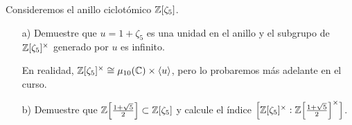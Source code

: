 \begin{ejercicio}
  Consideremos el anillo ciclotómico $\mathbb{Z} [\zeta_5]$.

  \begin{enumerate}
  \item[a)] Demuestre que $u = 1 + \zeta_5$ es una unidad en el anillo 
    y el subgrupo de $\mathbb{Z} [\zeta_5]^\times$ generado por $u$ es infinito.

    En realidad,
    $\mathbb{Z} [\zeta_5]^\times \cong \mu_{10} (\mathbb{C}) \times \langle u\rangle$,
    pero lo probaremos más adelante en el curso.

  \item[b)] Demuestre que
    $\mathbb{Z} \Bigl[\frac{1 + \sqrt{5}}{2}\Bigr] \subset \mathbb{Z} [\zeta_5]$ y calcule
    el índice
    $\Bigl[\mathbb{Z} [\zeta_5]^\times :
           \mathbb{Z} \Bigl[\frac{1 + \sqrt{5}}{2}\Bigr]^\times \Bigr]$.
  \end{enumerate}
\end{ejercicio}
